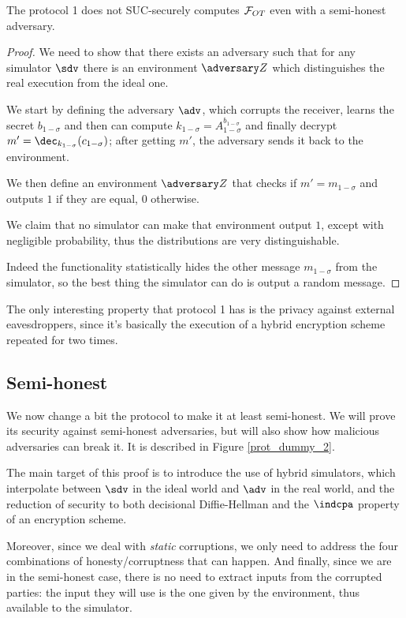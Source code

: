\begin{proposition}
    The protocol 1 does not SUC-securely computes $\mathcal{F}_{OT}$ even with a semi-honest adversary.
\end{proposition}

\begin{proof}
    We need to show that there exists an adversary such that for any simulator $\sdv$ there is an environment $\zdv$ which distinguishes the real execution from the ideal one.

    We start by defining the adversary $\adv$, which corrupts the receiver, learns the secret $b_{1-\sigma}$ and then can compute $k_{1-\sigma} = A_{1-\sigma}^{b_{1-\sigma}}$ and finally decrypt $m'=\dec_{k_{1-\sigma}}(c_{1-\sigma})$; after getting $m'$, the adversary sends it back to the environment.

    We then define an environment $\zdv$ that checks if $m'=m_{1-\sigma}$ and outputs $1$ if they are equal, $0$ otherwise.

    We claim that no simulator can make that environment output $1$, except with negligible probability, thus the distributions are very distinguishable.

    Indeed the functionality statistically hides the other message $m_{1-\sigma}$ from the simulator, so the best thing the simulator can do is output a random message.
\end{proof}

The only interesting property that protocol 1 has is the privacy against external eavesdroppers, since it's basically the execution of a hybrid encryption scheme repeated for two times.


\subsection{Semi-honest}
We now change a bit the protocol to make it at least semi-honest. We will prove its security against semi-honest adversaries, but will also show how malicious adversaries can break it. It is described in Figure \ref{prot_dummy_2}.

The main target of this proof is to introduce the use of hybrid simulators, which interpolate between $\sdv$ in the ideal world and $\adv$ in the real world, and the reduction of security to both decisional Diffie-Hellman and the $\indcpa$ property of an encryption scheme.

Moreover, since we deal with \emph{static} corruptions, we only need to address the four combinations of honesty/corruptness that can happen. And finally, since we are in the semi-honest case, there is no need to extract inputs from the corrupted parties: the input they will use is the one given by the environment, thus available to the simulator.

